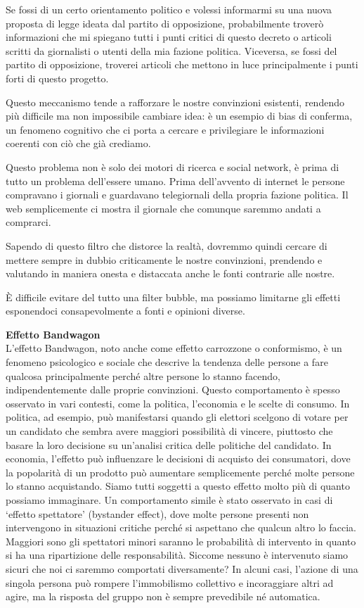 \documentclass[12pt]{book} %
\begin{document}
Se fossi di un certo orientamento politico e volessi informarmi su una nuova proposta di legge ideata dal partito di
opposizione, probabilmente troverò informazioni che mi spiegano tutti i punti critici di questo decreto o articoli
scritti da giornalisti o utenti della mia fazione politica. Viceversa, se fossi del partito di opposizione, troverei
articoli che mettono in luce principalmente i punti forti di questo progetto.

Questo meccanismo tende a rafforzare le nostre convinzioni esistenti, rendendo più difficile ma non impossibile cambiare idea: è un esempio di bias di conferma, un fenomeno cognitivo che ci porta a cercare e privilegiare le informazioni coerenti con ciò che già crediamo.

Questo problema non è solo dei motori di ricerca e social network, è prima di tutto un problema
dell'essere umano. Prima dell'avvento di internet le persone compravano i
giornali e guardavano telegiornali della propria fazione politica. Il web semplicemente ci mostra il giornale che
comunque saremmo andati a comprarci.

Sapendo di questo filtro che distorce la realtà, dovremmo quindi cercare di mettere sempre in dubbio criticamente le
nostre convinzioni, prendendo e valutando in maniera onesta e distaccata anche le fonti contrarie alle nostre.

È difficile evitare del tutto una filter bubble, ma possiamo limitarne gli effetti esponendoci consapevolmente a fonti e opinioni diverse.


\bigskip

\noindent \textbf{\large Effetto Bandwagon} \\
L'effetto Bandwagon, noto anche come effetto carrozzone o conformismo, è un fenomeno psicologico e
sociale che descrive la tendenza delle persone a fare qualcosa principalmente perché altre persone lo stanno facendo,
indipendentemente dalle proprie convinzioni. Questo comportamento è spesso osservato in vari contesti, come la
politica, l'economia e le scelte di consumo. In politica, ad esempio, può manifestarsi quando gli
elettori scelgono di votare per un candidato che sembra avere maggiori possibilità di vincere, piuttosto che basare la
loro decisione su un'analisi critica delle politiche del candidato. In economia,
l'effetto può influenzare le decisioni di acquisto dei consumatori, dove la popolarità di un
prodotto può aumentare semplicemente perché molte persone lo stanno acquistando. Siamo tutti soggetti a questo effetto
molto più di quanto possiamo immaginare. Un comportamento simile è stato osservato in casi di ‘effetto spettatore’ (bystander effect), dove molte persone presenti non intervengono in situazioni critiche perché si aspettano che qualcun altro lo faccia. Maggiori sono gli spettatori minori saranno le
probabilità di intervento in quanto si ha una ripartizione delle responsabilità. Siccome nessuno è intervenuto siamo
sicuri che noi ci saremmo comportati diversamente? In alcuni casi, l’azione di una singola persona può rompere l’immobilismo collettivo e incoraggiare altri ad agire, ma la risposta del gruppo non è sempre prevedibile né automatica.
\end{document}
